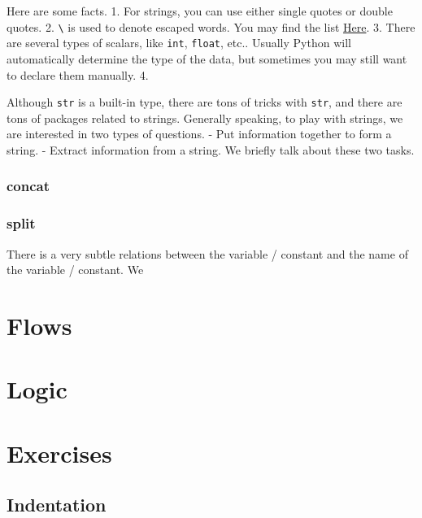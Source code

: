 \documentclass[
]{book}
\begin{document}
Here are some facts.
1. For strings, you can use either single quotes or double quotes.
2. \texttt{\textbackslash{}} is used to denote escaped words. You may find the list \href{https://www.w3schools.com/python/gloss_python_escape_characters.asp}{Here}.
3. There are several types of scalars, like \texttt{int}, \texttt{float}, etc.. Usually Python will automatically determine the type of the data, but sometimes you may still want to declare them manually.
4.

Although \texttt{str} is a built-in type, there are tons of tricks with \texttt{str}, and there are tons of packages related to strings. Generally speaking, to play with strings, we are interested in two types of questions.
- Put information together to form a string.
- Extract information from a string.
We briefly talk about these two tasks.

\hypertarget{concat}{%
\subsubsection{concat}\label{concat}}

\hypertarget{split}{%
\subsubsection{split}\label{split}}

There is a very subtle relations between the variable / constant and the name of the variable / constant. We

\hypertarget{flows}{%
\section{Flows}\label{flows}}

\hypertarget{logic}{%
\section{Logic}\label{logic}}

\hypertarget{exercises}{%
\section{Exercises}\label{exercises}}

\hypertarget{indentation-1}{%
\subsection{Indentation}\label{indentation-1}}
\end{document}
